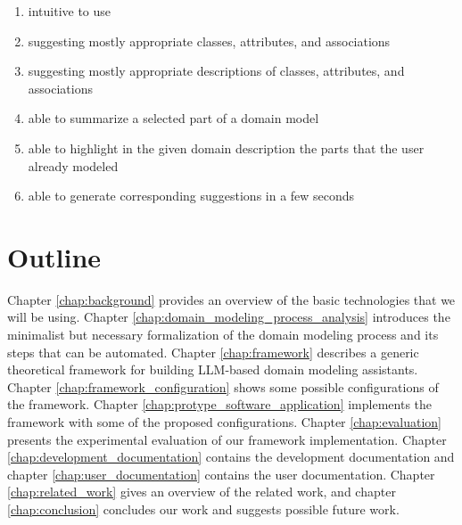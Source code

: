 \begin{enumerate}
\item intuitive to use
\item suggesting mostly appropriate classes, attributes, and associations
\item suggesting mostly appropriate descriptions of classes, attributes, and associations
\item able to summarize a selected part of a domain model
\item able to highlight in the given domain description the parts that the user already modeled
\item able to generate corresponding suggestions in a few seconds
\end{enumerate}


\section*{Outline}

Chapter \ref{chap:background} provides an overview of the basic technologies that we will be using.
Chapter \ref{chap:domain_modeling_process_analysis} introduces the minimalist but necessary formalization of the domain modeling process and its steps that can be automated.
Chapter \ref{chap:framework} describes a generic theoretical framework for building LLM-based domain modeling assistants.
Chapter \ref{chap:framework_configuration} shows some possible configurations of the framework.
Chapter \ref{chap:protype_software_application} implements the framework with some of the proposed configurations.
Chapter \ref{chap:evaluation} presents the experimental evaluation of our framework implementation.
Chapter \ref{chap:development_documentation} contains the development documentation and chapter \ref{chap:user_documentation} contains the user documentation. Chapter \ref{chap:related_work} gives an overview of the related work, and chapter \ref{chap:conclusion} concludes our work and suggests possible future work.